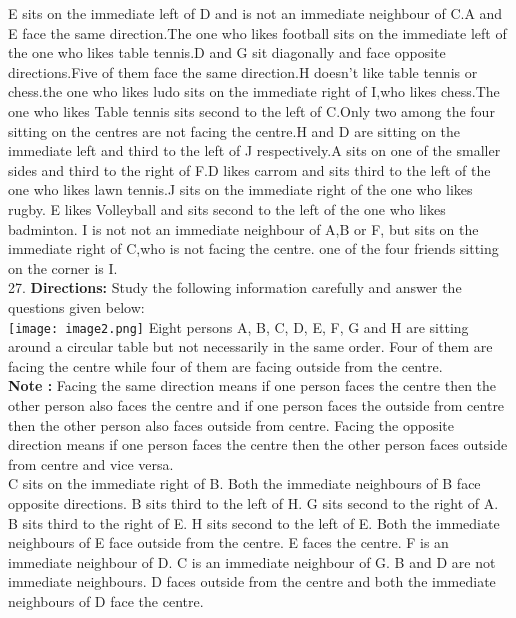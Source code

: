 \documentclass[
]{article}
\begin{document}
E sits on the immediate left of D and is not an immediate neighbour of C.A and E face the
same direction.The one who likes football sits on the immediate left of the one who likes
table tennis.D and G sit diagonally and face opposite directions.Five of them face the same
direction.H doesn't like table tennis or chess.the one who likes ludo sits on the immediate
right of I,who likes chess.The one who likes Table tennis sits second to the left of C.Only two
among the four sitting on the centres are not facing the centre.H and D are sitting on the
immediate left and third to the left of J respectively.A sits on one of the smaller sides and
third to the right of F.D likes carrom and sits third to the left of the one who likes lawn tennis.J sits on the immediate right of the one who likes rugby. E likes Volleyball and sits
second to the left of the one who likes badminton. I is not not an immediate neighbour of
A,B or F, but sits on the immediate right of C,who is not facing the centre. one of the four
friends sitting on the corner is I.\\

27. \textbf{Directions:} Study the following information carefully and answer the questions given
below:\\
\texttt{[image: image2.png]}
Eight persons A, B, C, D, E, F, G and H are sitting around a circular table but not necessarily
in the same order. Four of them are facing the centre while four of them are facing outside
from the centre.\\

\textbf{Note :} Facing the same direction means if one person faces the centre then the other person
also faces the centre and if one person faces the outside from centre then the other person
also faces outside from centre. Facing the opposite direction means if one person faces the
centre then the other person faces outside from centre and vice versa.\\

C sits on the immediate right of B. Both the immediate neighbours of B face opposite
directions. B sits third to the left of H. G sits second to the right of A. B sits third to the right
of E. H sits second to the left of E. Both the immediate neighbours of E face outside from the
centre. E faces the centre. F is an immediate neighbour of D. C is an immediate neighbour of
G. B and D are not immediate neighbours. D faces outside from the centre and both the
immediate neighbours of D face the centre.\\
\end{document}
